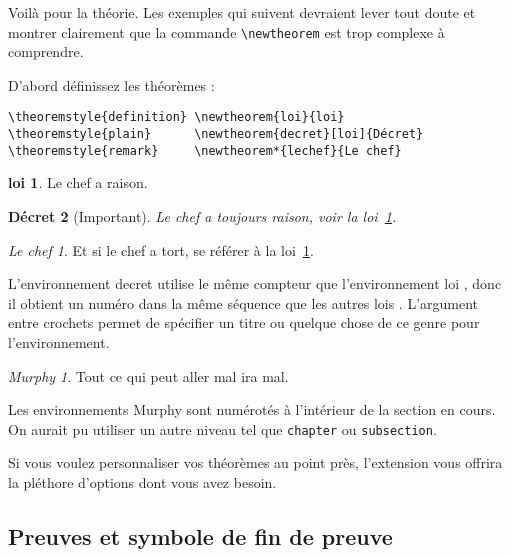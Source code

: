 Voilà pour la théorie. Les exemples qui suivent devraient lever tout
doute et montrer clairement que la commande \verb|\newtheorem| est
trop complexe à comprendre.

\theoremstyle{definition} \newtheorem{loi}{loi}
\theoremstyle{plain}      \newtheorem{decret}[loi]{Décret}
\theoremstyle{remark}     \newtheorem*{lechef}{Le chef}

D'abord définissez les théorèmes :

\begin{verbatim}
\theoremstyle{definition} \newtheorem{loi}{loi}
\theoremstyle{plain}      \newtheorem{decret}[loi]{Décret}
\theoremstyle{remark}     \newtheorem*{lechef}{Le chef}
\end{verbatim}

\begin{example}
\begin{loi} \label{chef}
Le chef a raison.
\end{loi}
\begin{decret}[Important]
Le chef a toujours raison,
voir la loi~\ref{chef}.
\end{decret}
\begin{lechef}
Et si le chef a tort, se référer
à la loi~\ref{chef}.
\end{lechef}
\end{example}


L'environnement \og decret \fg{} utilise le même compteur que l'environnement
\og loi \fg{}, donc il obtient un numéro dans la même
séquence que les autres \og lois \fg{}. L'argument entre crochets permet
de spécifier un titre ou quelque chose de ce genre pour l'environnement.
\begin{example}
\newtheorem{mur}{Murphy}[section]
\begin{mur} Tout ce qui peut 
aller mal ira mal.\end{mur}
\end{example}

Les environnements \og Murphy \fg{} sont numérotés à l'intérieur de la section
en cours. On aurait pu utiliser un autre niveau tel que \texttt{chapter}
ou \texttt{subsection}. 

Si vous voulez personnaliser vos théorèmes au point près, l'extension
 vous offrira la pléthore d'options dont vous avez
besoin.

\subsection{Preuves et symbole de fin de preuve}
\label{sec:putting-qed-right}

